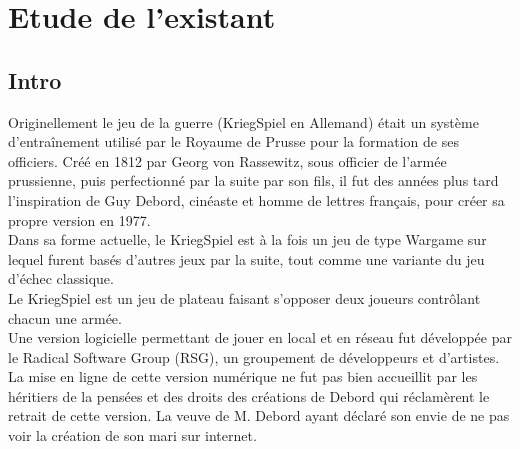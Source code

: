 \chapter{Etude de l'existant}

	
	\section{Intro}

	Originellement le jeu de la guerre (KriegSpiel en Allemand) était un système d'entraînement utilisé par le Royaume de Prusse pour la formation de ses officiers. Créé en 1812 par Georg von Rassewitz, sous officier de l'armée prussienne, puis perfectionné par la suite par son fils, il fut des années plus tard l'inspiration de Guy Debord, cinéaste et homme de lettres français, pour créer sa propre version en 1977.\\	
	
	Dans sa forme actuelle, le KriegSpiel est à la fois un jeu de type Wargame sur lequel furent basés d'autres jeux par la suite, tout comme une variante du jeu d'échec classique.\\

	Le KriegSpiel est un jeu de plateau faisant s'opposer deux joueurs contrôlant chacun une armée.\\

	Une version logicielle permettant de jouer en local et en réseau fut développée par le Radical Software Group (RSG), un groupement de développeurs et d'artistes. La mise en ligne de cette version numérique ne fut pas bien accueillit par les héritiers de la pensées et des droits des créations de Debord qui réclamèrent le retrait de cette version. La veuve de M. Debord ayant déclaré son envie de ne pas voir la création de son mari sur internet.
		
	\clearpage
